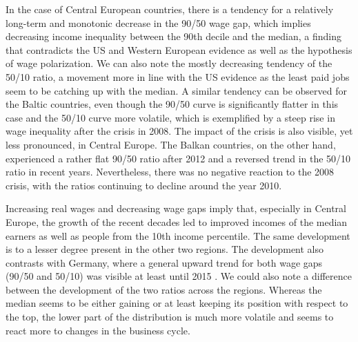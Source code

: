 \documentclass[11pt]{article}
\begin{document}
In the case of Central European countries, there is a tendency for a relatively long-term and monotonic decrease in the 90/50 wage gap, which implies decreasing income inequality between the 90th decile and the median, a finding that contradicts the US and Western European evidence as well as the hypothesis of wage polarization. We can also note the mostly decreasing tendency of the 50/10 ratio, a movement more in line with the US evidence as the least paid jobs seem to be catching up with the median. A similar tendency can be observed for the Baltic countries, even though the 90/50 curve is significantly flatter in this case and the 50/10 curve more volatile, which is exemplified by a steep rise in wage inequality after the crisis in 2008. The impact of the crisis is also visible, yet less pronounced, in Central Europe. The Balkan countries, on the other hand, experienced a rather flat 90/50 ratio after 2012 and a reversed trend in the 50/10 ratio in recent years. Nevertheless, there was no negative reaction to the 2008 crisis, with the ratios continuing to decline around the year 2010.

Increasing real wages and decreasing wage gaps imply that, especially in Central Europe, the growth of the recent decades led to improved incomes of the median earners as well as people from the 10th income percentile. The same development is to a lesser degree present in the other two regions. The development also contrasts with Germany, where a general upward trend for both wage gaps (90/50 and 50/10) was visible at least until 2015 \citep{biewen2021labour}. We could also note a difference between the development of the two ratios across the regions. Whereas the median seems to be either gaining or at least keeping its position with respect to the top, the lower part of the distribution is much more volatile and seems to react more to changes in the business cycle.
\end{document}
